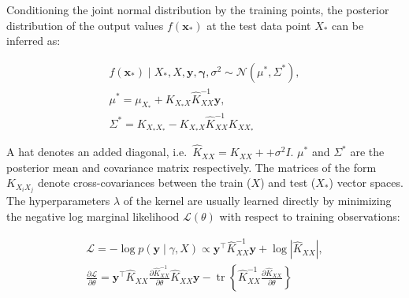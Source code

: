 \documentclass[a4paper, nobind]{templates/cdethesis}
\begin{document}
Conditioning the joint normal distribution by the training points, the posterior distribution of the output values \(f(\mathbf{x}_{*})\) at the test data point \(X_*\) can be inferred as:

\begin{equation}
\begin{aligned}
f(\mathbf{x}_{*}) \mid X_{*}, X, \mathbf{y}, \boldsymbol{\gamma}, \sigma^{2} \sim \mathcal{N}(\mu^{*}, \Sigma^{*}), \\
\mu^{*} = \mu_{X_*} + K_{X_*X}\widehat{K}_{XX}^{-1}\mathbf{y}, \\
\Sigma^{*} = K_{X_*X_*} - K_{X_*X}\widehat{K}_{XX}^{-1}K_{XX_*}
\end{aligned} \label{eq:2}
\end{equation}

A hat denotes an added diagonal, i.e.~\(\widehat{K}_{XX} = K_{XX} + + \sigma^{2}I\). \(\mu^{*}\) and \(\Sigma^{*}\) are the posterior mean and covariance matrix respectively. The matrices of the form \(K_{X_iX_j}\) denote cross-covariances between the train (\(X\)) and test (\(X_*\)) vector spaces. The hyperparameters \(\lambda\) of the kernel are usually learned directly by minimizing the negative log marginal likelihood \(\mathcal{L}(\theta)\) with respect to training observations:

\begin{equation}
\begin{aligned}
\mathcal{L} = - \log p(\mathbf{y} \mid \gamma, X) \propto \mathbf{y}^{\top} \widehat{K}_{XX}^{-1} \mathbf{y} + \log \left|\widehat{K}_{X X}\right|, \\
\frac{\partial \mathcal{L}}{\partial \theta} = \mathbf{y}^{\top} \widehat{K}_{XX} \frac{\partial \widehat{K}_{X X}^{-1}}{\partial \theta} \widehat{K}_{X X} \mathbf{y}-\operatorname{tr}\left\{\widehat{K}_{X X}^{-1} \frac{\partial \widehat{K}_{XX}}{\partial \theta}\right\}
\label{eq:3}
\end{aligned}
\end{equation}
\end{document}
